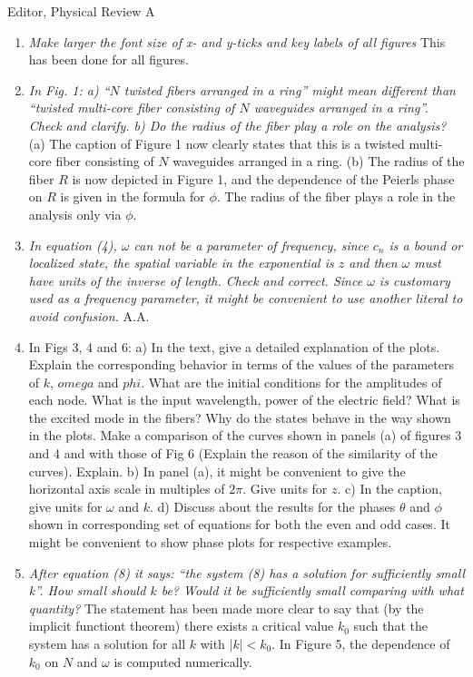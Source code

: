 \documentclass[11pt]{letter}
\begin{document}
\begin{letter}{Editor, Physical Review A}
\begin{enumerate}
\item \emph{Make larger the font size of x- and y-ticks and key labels of all figures} This has been done for all figures.

\item \emph{In Fig. 1: a) ``$N$ twisted fibers arranged in a ring'' might mean different than ``twisted multi-core fiber consisting of $N$ waveguides arranged in a ring''. Check and clarify. b) Do the radius of the fiber play a role on the analysis?} (a) The caption of Figure 1 now clearly states that this is a twisted multi-core fiber consisting of $N$ waveguides arranged in a ring. (b) The radius of the fiber $R$ is now depicted in Figure 1, and the dependence of the Peierls phase on $R$ is given in the formula for $\phi$. The radius of the fiber plays a role in the analysis only via $\phi$.

\item \emph{In equation (4), $\omega$ can not be a parameter of frequency, since $c_n$ is a bound or localized state, the spatial variable in the exponential is $z$ and then $\omega$ must have units of the inverse of length. Check and correct. Since $\omega$ is customary used as a frequency parameter, it might be convenient to use another literal to avoid confusion.} A.A.

\item In Figs 3, 4 and 6: a) In the text, give a detailed explanation of the plots. Explain the corresponding behavior in terms of the values of the parameters of $k$, $omega$ and $phi$. What are the initial conditions for the amplitudes of each node. What is the input wavelength, power of the electric field? What is the excited mode in the fibers? Why do the states behave in the way shown in the plots.  Make a comparison of the curves shown in panels (a) of figures 3 and 4 and with those of Fig 6 (Explain the reason of the similarity of the curves). Explain. b) In panel (a), it might be convenient to give the horizontal axis scale in multiples of $2\pi$. Give units for $z$. c) In the caption, give units for $\omega$ and $k$. d) Discuss about the results for the phases $\theta$ and $\phi$ shown in corresponding set of equations for both the even and odd cases. It might be convenient to show phase plots for respective examples.

\item \emph{After equation (8) it says: ``the system (8) has a solution for sufficiently small k''. How small should $k$ be? Would it be sufficiently small comparing with what quantity?} The statement has been made more clear to say that (by the implicit functiont theorem) there exists a critical value $k_0$ such that the system has a solution for all $k$ with $|k| < k_0$. In Figure 5, the dependence of $k_0$ on $N$ and $\omega$ is computed numerically.


\end{enumerate}
\end{letter}
\end{document}
